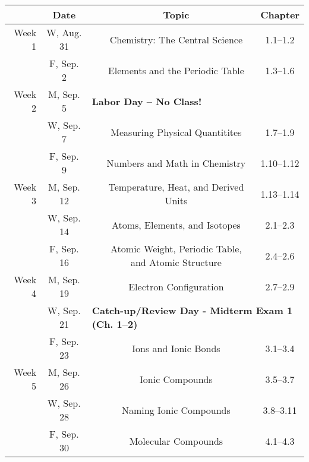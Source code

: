 \documentclass[12pt, letterpaper]{article}
\begin{document}
\noindent
\begin{tabular}{rcccc}
	       & Date       &  & Topic                           & Chapter  \\
	\midrule
	Week 1 & W, Aug. 31 &  & Chemistry: The Central Science  & 1.1--1.2 \\
	       & F, Sep. 2  &  & Elements and the Periodic Table & 1.3--1.6 \\
	\midrule
	Week 2 & M, Sep. 5  & \multicolumn{3}{l}{\textbf{Labor Day -- No Class!}}                                                                                             \\
	       & W, Sep. 7  &                                                                              & Measuring Physical Quantitites                      & 1.7--1.9   \\
	       & F, Sep. 9  &                                                                              & Numbers and Math in Chemistry                       & 1.10--1.12 \\
	\midrule
	Week 3 & M, Sep. 12 &                                                                              & Temperature, Heat, and Derived Units                & 1.13--1.14 \\
	       & W, Sep. 14 &                                                                              & Atoms, Elements, and Isotopes                       & 2.1--2.3   \\
	       & F, Sep. 16 &                                                                              & Atomic Weight, Periodic Table, and Atomic Structure & 2.4--2.6   \\
	\midrule
	Week 4 & M, Sep. 19 &                                                                              & Electron Configuration                              & 2.7--2.9   \\
	       & W, Sep. 21 & \multicolumn{3}{l}{\textbf{Catch-up/Review Day - Midterm Exam 1 (Ch. 1--2)}}                                                                    \\
	       & F, Sep. 23 &                                                                              & Ions and Ionic Bonds                                & 3.1--3.4   \\
	\midrule
	Week 5 & M, Sep. 26 &                                                                              & Ionic Compounds                                     & 3.5--3.7   \\
	       & W, Sep. 28 &                                                                              & Naming Ionic Compounds                              & 3.8--3.11  \\
	       & F, Sep. 30 &                                                                              & Molecular Compounds                                 & 4.1--4.3   \\
\end{tabular}
\end{document}
